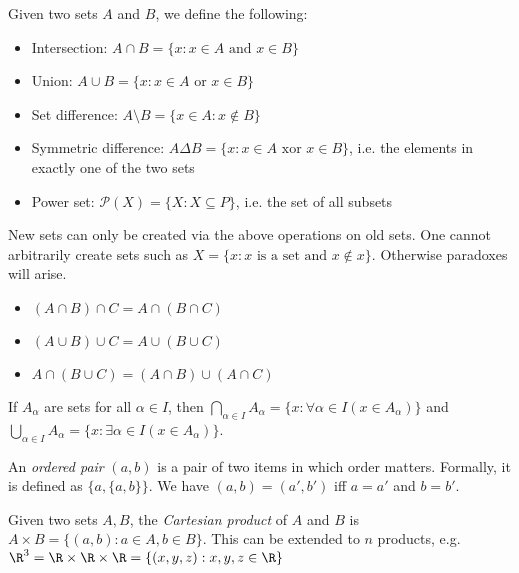 \documentclass[a4paper]{article}
\begin{document}
  \begin{defi}
    Given two sets $A$ and $B$, we define the following:
    \begin{itemize}
      \item Intersection: $A\cap B = \{x:x\in A \text{ and } x\in B\}$
      \item Union: $A\cup B = \{x:x\in A\text{ or }x\in B\}$
      \item Set difference: $A\setminus B = \{x\in A: x\not\in B\}$
      \item Symmetric difference: $A\Delta B = \{x: x\in A\text{ xor } x\in B\}$, i.e. the elements in exactly one of the two sets
      \item Power set: $\mathcal{P}(X) = \{X: X\subseteq P\}$, i.e. the set of all subsets
    \end{itemize}
  \end{defi}

  \note New sets can only be created via the above operations on old sets. One cannot arbitrarily create sets such as $X=\{x:x\text{ is a set and }x\not\in x\}$. Otherwise paradoxes will arise.

  \begin{prop}\leavevmode
    \begin{itemize}
      \item $(A\cap B)\cap C = A \cap (B\cap C)$
      \item $(A\cup B)\cup C = A\cup (B\cup C)$
      \item $A\cap(B\cup C) = (A\cap B)\cup (A\cap C)$
    \end{itemize}
  \end{prop}

  \begin{notation}
    If $A_\alpha$ are sets for all $\alpha \in I$, then $\bigcap_{\alpha\in I}A_\alpha = \{x:\forall\alpha\in I(x\in A_\alpha)\}$ and $\bigcup_{\alpha\in I}A_\alpha = \{x:\exists\alpha\in I(x\in A_\alpha)\}$.
  \end{notation}

  \begin{defi}
    An \emph{ordered pair} $(a, b)$ is a pair of two items in which order matters. Formally, it is defined as $\{a, \{a, b\}\}$. We have $(a, b) = (a', b')$ iff $a = a'$ and $b = b'$.
  \end{defi}

  \begin{defi}
    Given two sets $A, B$, the \emph{Cartesian product} of $A$ and $B$ is $A\times B = \{(a, b):a\in A, b\in B\}$. This can be extended to $n$ products, e.g. $\R^3 = \R\times\R\times\R = \{(x,y,z): x, y, z\in \R\}$
  \end{defi}
\end{document}
